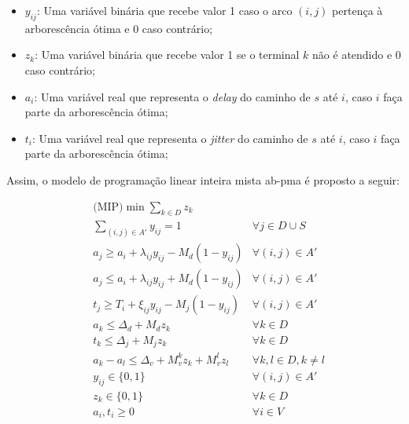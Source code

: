 \begin{itemize}
 \item $y_{ij}$: Uma  variável binária que recebe valor 1  caso o arco
   $(i, j)$ pertença à arborescência ótima e 0 caso contrário;
 \item $z_{k}$: Uma variável binária que  recebe valor 1 se o terminal
   $k$ não é atendido e 0 caso contrário;
 \item $a_{i}$: Uma  variável real que representa  o \textit{delay} do
   caminho de $s$ até $i$, caso $i$ faça parte da arborescência ótima;
 \item $t_{i}$: Uma variável real  que representa o \textit{jitter} do
   caminho de $s$ até $i$, caso $i$ faça parte da arborescência ótima;
\end{itemize}

Assim, o  modelo de  programação linear  inteira mista  \gls{ab-pma} é
proposto a seguir:

\begin{align}
 & \text{(MIP)} \min \sum_{k \in D} z_k & \label{eq:ab-fo} \\ 
 & \sum_{(i, j) \in A'} y_{ij} = 1 & \forall j \in D \cup S \label{eq:spanning} \\
 & a_j \geq a_i + \lambda_{ij} y_{ij} - M_d(1 - y_{ij}) & \forall (i, j) \in A' \label{eq:lambda-geq} \\
 & a_j \leq a_i + \lambda_{ij} y_{ij} + M_d(1 - y_{ij}) & \forall (i, j) \in A' \label{eq:lambda-leq} \\
 & t_j \geq T_i + \xi_{ij} y_{ij} - M_j(1 - y_{ij})& \forall (i, j) \in A' \label{eq:xi-geq} \\
 & a_k \leq \Delta_d + M_d z_k & \forall k \in D \label{eq:lim-delay} \\
 & t_k \leq \Delta_j + M_j z_k & \forall k \in D \label{eq:lim-jitter} \\
 & a_k - a_l \leq \Delta_v + M_v^k z_k + M_v^l z_l & \forall k, l \in D, k \neq l \label{eq:lim-var} \\
 & y_{ij} \in \{0, 1\} & \forall (i, j) \in A' \label{eq:ab-dom-y} \\
 & z_{k} \in \{0, 1\} & \forall k \in D \label{eq:ab-dom-z}\\
 & a_i, t_i \geq 0 & \forall i \in V \label{eq:ab-dom-l-t} 
\end{align}

